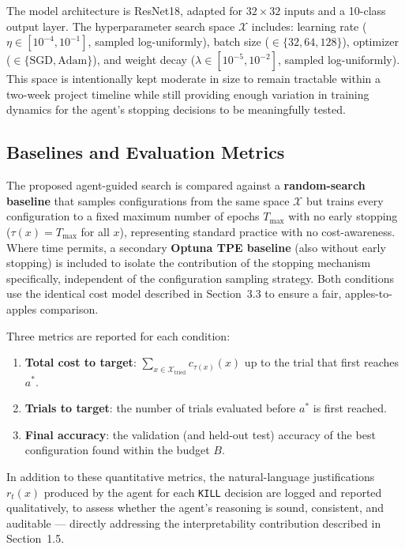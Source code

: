 \documentclass[11pt]{article}
\begin{document}
The model architecture is ResNet18, adapted for $32\times32$ inputs and a 10-class output layer. The hyperparameter search space $\mathcal{X}$ includes: learning rate ($\eta \in [10^{-4}, 10^{-1}]$, sampled log-uniformly), batch size ($\in \{32, 64, 128\}$), optimizer ($\in \{\text{SGD}, \text{Adam}\}$), and weight decay ($\lambda \in [10^{-5}, 10^{-2}]$, sampled log-uniformly). This space is intentionally kept moderate in size to remain tractable within a two-week project timeline while still providing enough variation in training dynamics for the agent's stopping decisions to be meaningfully tested.

\subsection{Baselines and Evaluation Metrics}

The proposed agent-guided search is compared against a \textbf{random-search baseline} that samples configurations from the same space $\mathcal{X}$ but trains every configuration to a fixed maximum number of epochs $T_{\max}$ with no early stopping ($\tau(x) = T_{\max}$ for all $x$), representing standard practice with no cost-awareness. Where time permits, a secondary \textbf{Optuna TPE baseline} (also without early stopping) is included to isolate the contribution of the stopping mechanism specifically, independent of the configuration sampling strategy. Both conditions use the identical cost model described in Section~3.3 to ensure a fair, apples-to-apples comparison.

Three metrics are reported for each condition:
\begin{enumerate}
    \item \textbf{Total cost to target}: $\sum_{x \in \mathcal{X}_{\text{tried}}} c_{\tau(x)}(x)$ up to the trial that first reaches $a^{*}$.
    \item \textbf{Trials to target}: the number of trials evaluated before $a^{*}$ is first reached.
    \item \textbf{Final accuracy}: the validation (and held-out test) accuracy of the best configuration found within the budget $B$.
\end{enumerate}
In addition to these quantitative metrics, the natural-language justifications $r_t(x)$ produced by the agent for each \texttt{KILL} decision are logged and reported qualitatively, to assess whether the agent's reasoning is sound, consistent, and auditable --- directly addressing the interpretability contribution described in Section~1.5.
\end{document}
